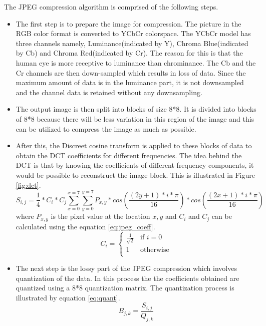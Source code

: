The JPEG compression algorithm is comprised of the following steps.
\begin{itemize}
\item The first step is to prepare the image for compression. The picture in the RGB color format is converted to YCbCr colorspace. The YCbCr model has three channels namely, Luminance(indicated by Y), Chroma Blue(indicated by Cb) and Chroma Red(indicated by Cr). The reason for this is that the human eye is more receptive to luminance than chrominance. The Cb and the Cr channels are then down-sampled which results in loss of data. Since the maximum amount of data is in the luminance part, it is not downsampled and the channel data is retained without any downsampling. 
\item The output image is then split into blocks of size 8*8.  It is divided into blocks of 8*8 because there will be less variation in this region of the image and this can be utilized to compress the image as much as possible.
\item After this, the Discreet cosine transform is applied to these blocks of data to obtain the DCT coefficients for different frequencies. The idea behind the DCT is that by knowing the coefficients of different frequency components, it would be possible to reconstruct the image block. This is illustrated in Figure \ref{fig:dct}.
\begin{equation}
 S_{i,j} = \frac{1}{4} * C_i * C_j \sum_{x=0}^{x=7}\sum_{y=0}^{y=7}P_{x,y} *cos(\frac{(2y+1)*i*\pi}{16})*cos(\frac{(2x+1)*i*\pi}{16})
\end{equation}
where $P_{x,y}$ is the pixel value at the location $x,y$ and $C_i$ and $C_j$ can be calculated using the equation \ref{eq:jpeg_coeff}.
\begin{equation}
  C_i =
  \begin{cases}
    \frac{1}{\sqrt{2}} & \text{if $i = 0$} \\
    1 & \text{otherwise} \\
  \end{cases}
  \label{eq:jpeg_coeff}
\end{equation}
\item The next step is the lossy part of the JPEG compression which involves quantization of the data. In this process the the coefficients obtained are quantized using a 8*8 quantization matrix. The quantization process is illustrated by equation \ref{eq:quant}.
\begin{equation}
B_{j,k} = \frac{S_{i,j}}{Q_{j,k}}
\label{eq:quant}
\end{equation}


\end{itemize}
